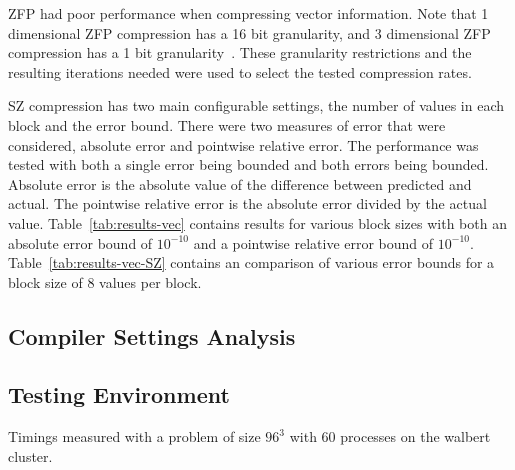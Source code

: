 ZFP had poor performance when compressing vector information.
Note that 1 dimensional ZFP compression has a 16 bit granularity, and 3 dimensional ZFP compression has a 1 bit granularity~\cite{Lindstrom:2014:zfp}.
These granularity restrictions and the resulting iterations needed were used to select the tested compression rates.

SZ compression has two main configurable settings, the number of values in each block and the error bound.
There were two measures of error that were considered, absolute error and pointwise relative error.
The performance was tested with both a single error being bounded and both errors being bounded.
Absolute error is the absolute value of the difference between predicted and actual.
The pointwise relative error is the absolute error divided by the actual value.
Table~\ref{tab:results-vec} contains results for various block sizes with both an absolute error bound of \(10^{-10}\) and a pointwise relative error bound of \(10^{-10}\).
Table~\ref{tab:results-vec-SZ} contains an comparison of various error bounds for a block size of 8 values per block.



\subsection{Compiler Settings Analysis}

\subsection{Testing Environment}
Timings measured with a problem of size \(96^3\) with 60 processes on the walbert cluster.